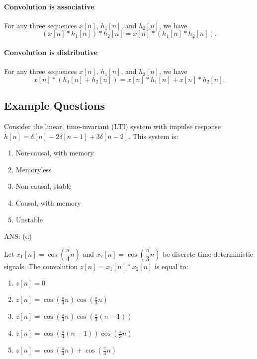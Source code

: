\paragraph{Convolution is associative} For any three sequences $x[n]$, $h_1[n]$, and $h_2[n]$, we have
\[
    (x[n] * h_1[n]) * h_2[n] = x[n] * (h_1[n] * h_2[n]).
\]

\paragraph{Convolution is distributive} For any three sequences $x[n]$, $h_1[n]$, and $h_2[n]$, we have
\[
    x[n] * (h_1[n] + h_2[n]) = x[n] * h_1[n] + x[n] * h_2[n].
\]


\subsection{Example Questions}
\begin{q}{}
Consider the linear, time-invariant (LTI) system with impulse response $h[n] = \delta[n] - 2\delta[n-1] + 3\delta[n-2]$. This system is:
\begin{enumerate}[label=(\alph*)]
    \item Non-causal, with memory
    \item Memoryless
    \item Non-causal, stable
    \item Causal, with memory
    \item Unstable
\end{enumerate}

\begin{flushright}
    \begin{blueenv}
        ANS: (d)
    \end{blueenv}
\end{flushright}
\end{q}
\begin{q}{}
Let $x_{1}[n] = \cos\left(\dfrac{\pi}{4} n\right)$ and $x_{2}[n] = \cos\left(\dfrac{\pi}{3}n\right)$ be discrete-time deterministic signals. The convolution $z[n] = x_{1}[n] * x_{2}[n]$ is equal to:

\begin{enumerate}[label=(\alph*)]
    \item $z[n] = 0$
    \item $z[n] = \cos(\frac{\pi}{4} n) \cos(\frac{\pi}{3}n)$
    \item $z[n] = \cos(\frac{\pi}{4} n) \cos(\frac{\pi}{3}(n-1))$
    \item $z[n] = \cos(\frac{\pi}{4} (n-1)) \cos(\frac{\pi}{3}n)$
    \item $z[n] = \cos(\frac{\pi}{4} n) + \cos(\frac{\pi}{3}n)$
\end{enumerate}
\end{q}
